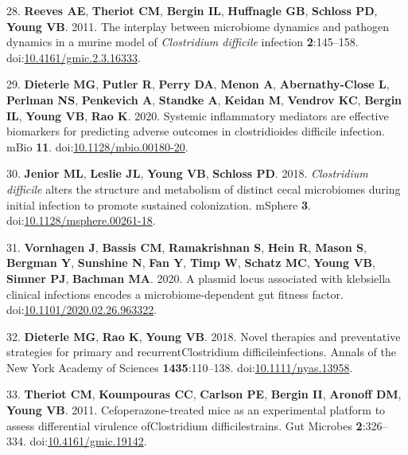 \documentclass[
  11pt,
]{article}
\begin{document}
\leavevmode\hypertarget{ref-Reeves2011}{}%
28. \textbf{Reeves AE}, \textbf{Theriot CM}, \textbf{Bergin IL},
\textbf{Huffnagle GB}, \textbf{Schloss PD}, \textbf{Young VB}. 2011. The
interplay between microbiome dynamics and pathogen dynamics in a murine
model of \emph{Clostridium difficile} infection \textbf{2}:145--158.
doi:\href{https://doi.org/10.4161/gmic.2.3.16333}{10.4161/gmic.2.3.16333}.

\leavevmode\hypertarget{ref-Dieterle2020}{}%
29. \textbf{Dieterle MG}, \textbf{Putler R}, \textbf{Perry DA},
\textbf{Menon A}, \textbf{Abernathy-Close L}, \textbf{Perlman NS},
\textbf{Penkevich A}, \textbf{Standke A}, \textbf{Keidan M},
\textbf{Vendrov KC}, \textbf{Bergin IL}, \textbf{Young VB}, \textbf{Rao
K}. 2020. Systemic inflammatory mediators are effective biomarkers for
predicting adverse outcomes in clostridioides difficile infection. mBio
\textbf{11}.
doi:\href{https://doi.org/10.1128/mbio.00180-20}{10.1128/mbio.00180-20}.

\leavevmode\hypertarget{ref-Jenior2018}{}%
30. \textbf{Jenior ML}, \textbf{Leslie JL}, \textbf{Young VB},
\textbf{Schloss PD}. 2018. \emph{Clostridium difficile} alters the
structure and metabolism of distinct cecal microbiomes during initial
infection to promote sustained colonization. mSphere \textbf{3}.
doi:\href{https://doi.org/10.1128/msphere.00261-18}{10.1128/msphere.00261-18}.

\leavevmode\hypertarget{ref-Vornhagen2020}{}%
31. \textbf{Vornhagen J}, \textbf{Bassis CM}, \textbf{Ramakrishnan S},
\textbf{Hein R}, \textbf{Mason S}, \textbf{Bergman Y}, \textbf{Sunshine
N}, \textbf{Fan Y}, \textbf{Timp W}, \textbf{Schatz MC}, \textbf{Young
VB}, \textbf{Simner PJ}, \textbf{Bachman MA}. 2020. A plasmid locus
associated with klebsiella clinical infections encodes a
microbiome-dependent gut fitness factor.
doi:\href{https://doi.org/10.1101/2020.02.26.963322}{10.1101/2020.02.26.963322}.

\leavevmode\hypertarget{ref-Dieterle2018}{}%
32. \textbf{Dieterle MG}, \textbf{Rao K}, \textbf{Young VB}. 2018. Novel
therapies and preventative strategies for primary and
recurrentClostridium difficileinfections. Annals of the New York Academy
of Sciences \textbf{1435}:110--138.
doi:\href{https://doi.org/10.1111/nyas.13958}{10.1111/nyas.13958}.

\leavevmode\hypertarget{ref-Theriot2011}{}%
33. \textbf{Theriot CM}, \textbf{Koumpouras CC}, \textbf{Carlson PE},
\textbf{Bergin II}, \textbf{Aronoff DM}, \textbf{Young VB}. 2011.
Cefoperazone-treated mice as an experimental platform to assess
differential virulence ofClostridium difficilestrains. Gut Microbes
\textbf{2}:326--334.
doi:\href{https://doi.org/10.4161/gmic.19142}{10.4161/gmic.19142}.
\end{document}
